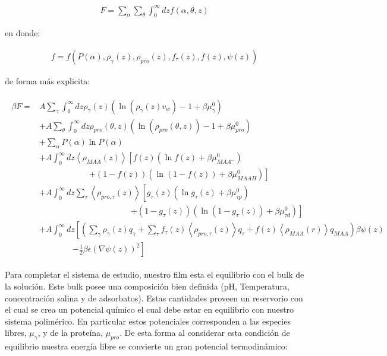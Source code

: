 \begin{align}
	F = \sum_\alpha \sum_\theta \int_0^\infty dz f(\alpha, \theta,z)
\end{align}

\noindent en donde:

\begin{align}
	 f=  f \left( P(\alpha), \rho_\gamma(z),\rho_{pro}(z), f_\tau(z), f(z), \psi(z)  \right)
	 \label{eq:film:funcionales}
 \end{align}

de forma m\'as explicita:

\begin{align}
	\begin{aligned}
		\beta F=  & A\sum_{\gamma}\int_0^\infty{dz\rho_\gamma(z)\left(\ln \left(\rho_\gamma (z)v_w\right) -1 + \beta\mu^0_\gamma\right)} \\
		&+ A\sum_{\theta}\int_0^\infty{dz\rho_{pro}(\theta,z)\left(\ln \left(\rho_{pro}(\theta,z)\right) -1 + \beta\mu^0_{pro} \right)} \\
		&+ \sum_\alpha{P(\alpha)\ln P(\alpha)} \\
		& + A\int_0^\infty dz \left<\rho_{MAA}(z)\right> \left[f(z)(\ln f(z)+ \beta\mu^0_{MAA^-})\right.\\
		& \qquad\qquad\qquad \left.+(1-f(z))(\ln (1-f(z))+\beta\mu^0_{MAAH})\right] \\
		& + A\int_0^\infty dz \sum_\tau \left<\rho_{pro,\tau}(z)\right> \left[g_\tau(z)(\ln g_\tau(z)+ \beta\mu^0_{\tau p})\right.\\
		&\qquad \qquad \qquad\qquad \qquad\quad \left.+(1-g_\tau(z))(\ln (1-g_\tau(z))+\beta\mu^0_{\tau d})\right]   \\
		 & +A\int_0^\infty dz \left[\left(\sum_{\gamma } {\rho_\gamma(z) q_\gamma + \sum_\tau{f_\tau(z) \left<\rho_{pro,\tau}(z)\right> q_\tau} +  f(z)\left<\rho_{MAA}(r)\right>q_{MAA}}\right)\beta\psi(z) \right. \\ & \qquad \qquad \left.-\frac{1}{2}\beta\epsilon(\nabla\psi(z))^2 \right]
		\end{aligned}
\end{align}


Para completar el sistema de estudio, nuestro film esta el equilibrio con el bulk de la soluci\'on. Este bulk  posee una composici\'on bien definida (pH, Temperatura, concentraci\'on salina y de adsorbatos). Estas cantidades proveen un reservorio con el cual se crea un potencial qu\'imico el cual debe estar en equilibrio con nuestro sistema polim\'erico. En particular estos potenciales corresponden a las especies libres, $\mu_\gamma$, y de la prote\'ina, $\mu_{pro}$.
De esta forma al considerar esta condici\'on de equilibrio nuestra energ\'ia libre se convierte un gran potencial termodin\'amico:

